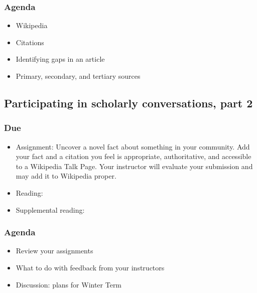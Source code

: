 \documentclass[12pt,article,oneside]{memoir}
\begin{document}
\subsubsection{Agenda}
\begin{itemize}
\item Wikipedia
\item Citations
\item Identifying gaps in an article
\item Primary, secondary, and tertiary sources
\end{itemize}

\subsection{Participating in scholarly conversations, part 2}
\subsubsection{Due}
\begin{itemize}
 \item Assignment: Uncover a novel fact about something in your community.  Add your fact and a citation you feel is appropriate, authoritative, and accessible to a Wikipedia Talk Page.  Your instructor will evaluate your submission and may add it to Wikipedia proper.
 \item Reading: \cite{eryk}
 \item Supplemental reading: \cite{doyle}
\end{itemize}

\subsubsection{Agenda}
\begin{itemize}
\item Review your assignments
\item What to do with feedback from your instructors
\item Discussion: plans for Winter Term
\end{itemize}



\newpage
\renewcommand{\bibname}{Reading list}
{}

\end{document}
